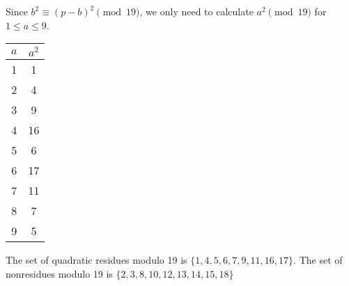 Since  $b^2 \equiv (p-b)^2 \pmod{19}$, we only need to calculate $a^2 \pmod{19}$
for $1 \leq a \leq 9$.

\begin{table}[H]
\centering
\begin{tabular}{c|c}
	$a$ & $a^2$ \\ \hline
	1   & 1  \\
	2   & 4  \\
	3   & 9  \\
	4   & 16 \\
	5   & 6  \\
	6   & 17 \\
	7   & 11 \\
	8   & 7  \\
	9   & 5
\end{tabular}
\end{table}

The set of quadratic residues modulo 19 is $\{1, 4, 5, 6, 7, 9, 11, 16, 17 \}$.
The set of nonresidues modulo 19 is $\{2, 3, 8, 10, 12, 13, 14, 15, 18 \}$
